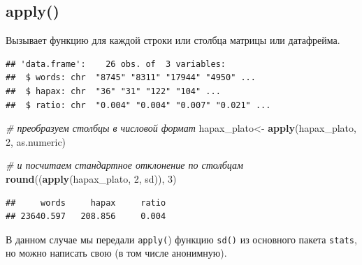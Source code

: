 \documentclass[
]{book}
\newenvironment{Shaded}{\begin{snugshade}}{\end{snugshade}}
\newcommand{\AttributeTok}[1]{\textcolor[rgb]{0.13,0.29,0.53}{#1}}
\newcommand{\CommentTok}[1]{\textcolor[rgb]{0.56,0.35,0.01}{\textit{#1}}}
\newcommand{\DecValTok}[1]{\textcolor[rgb]{0.00,0.00,0.81}{#1}}
\newcommand{\FunctionTok}[1]{\textcolor[rgb]{0.13,0.29,0.53}{\textbf{#1}}}
\newcommand{\NormalTok}[1]{#1}
\newcommand{\OtherTok}[1]{\textcolor[rgb]{0.56,0.35,0.01}{#1}}
\newcommand{\SpecialCharTok}[1]{\textcolor[rgb]{0.81,0.36,0.00}{\textbf{#1}}}
\theoremstyle{definition}
\theoremstyle{definition}
\theoremstyle{definition}
\theoremstyle{definition}
\theoremstyle{remark}
\begin{document}
\hypertarget{apply}{%
\subsection{apply()}\label{apply}}

Вызывает функцию для каждой строки или столбца матрицы или датафрейма.

\begin{Shaded}
\end{Shaded}

\begin{verbatim}
## 'data.frame':    26 obs. of  3 variables:
##  $ words: chr  "8745" "8311" "17944" "4950" ...
##  $ hapax: chr  "36" "31" "122" "104" ...
##  $ ratio: chr  "0.004" "0.004" "0.007" "0.021" ...
\end{verbatim}

\begin{Shaded}
\begin{Highlighting}[]
\CommentTok{\# преобразуем столбцы в числовой формат}
\NormalTok{hapax\_plato}\OtherTok{\textless{}{-}} \FunctionTok{apply}\NormalTok{(hapax\_plato, }\DecValTok{2}\NormalTok{, as.numeric)}

\CommentTok{\# и посчитаем стандартное отклонение по столбцам}
\FunctionTok{round}\NormalTok{((}\FunctionTok{apply}\NormalTok{(hapax\_plato, }\DecValTok{2}\NormalTok{, sd)), }\DecValTok{3}\NormalTok{)}
\end{Highlighting}
\end{Shaded}

\begin{verbatim}
##     words     hapax     ratio 
## 23640.597   208.856     0.004
\end{verbatim}

В данном случае мы передали \texttt{apply(}) функцию \texttt{sd()} из основного пакета \texttt{stats}, но можно написать свою (в том числе анонимную).
\end{document}
